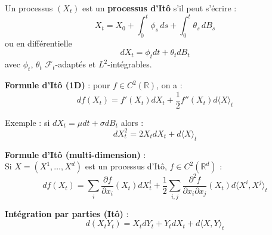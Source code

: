 \begin{f}
	
Un processus $(X_t)$ est un \textbf{processus d’Itô} s’il peut s’écrire :
	\[
	X_t = X_0 + \int_0^t \phi_s\, ds + \int_0^t \theta_s\, dB_s
	\]
	ou en différentielle
	\[dX_t = \phi_t dt + \theta_t dB_t\]
	avec $\phi_t$, $\theta_t$ $\mathcal{F}_t$-adaptés et $L^2$-intégrables.
	
	\textbf{Formule d’Itô (1D)} : pour $f \in C^2(\mathbb{R})$, on a :
	\[
	df(X_t) = f'(X_t) dX_t + \frac{1}{2} f''(X_t) d\langle X \rangle_t
	\]
	
	Exemple : si $dX_t = \mu dt + \sigma dB_t$ alors :
	\[
	dX_t^2 = 2X_t dX_t + d\langle X \rangle_t
	\]
	
	\textbf{Formule d’Itô (multi-dimension)} :\\
	Si $X = (X^1, \dots, X^d)$ est un processus d’Itô, $f \in C^2(\mathbb{R}^d)$ :
	\[
	df(X_t) = \sum_i \frac{\partial f}{\partial x_i}(X_t) dX^i_t
	+ \frac{1}{2} \sum_{i,j} \frac{\partial^2 f}{\partial x_i \partial x_j}(X_t) d\langle X^i, X^j \rangle_t
	\]
	
	\textbf{Intégration par parties (Itô)} :
	\[
	d(X_t Y_t) = X_t dY_t + Y_t dX_t + d\langle X, Y \rangle_t
	\]
	
\end{f}

